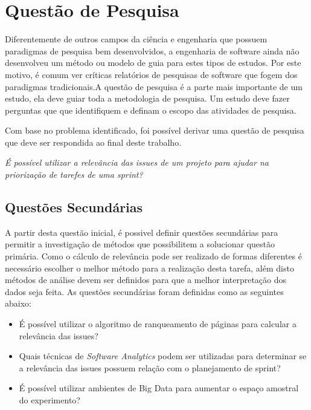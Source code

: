 \section{Questão de Pesquisa}

Diferentemente de outros campos da ciência e engenharia que possuem paradigmas de
pesquisa bem desenvolvidos, a engenharia de software ainda não desenvolveu um
método ou modelo de guia para estes tipos de estudos. Por este motivo, é
comum ver críticas relatórios de pesquisas de software que fogem dos paradigmas
tradicionais\cite{shaw}.A questão de pesquisa é a parte mais importante de um estudo, ela deve guiar toda
a metodologia de pesquisa. Um estudo deve fazer perguntas que que identifiquem e
definam o escopo das atividades de pesquisa\cite{guidelines}.

Com base no problema identificado, foi possível derivar uma questão de pesquisa
que deve ser respondida ao final deste trabalho.

\begin{center}
    \textit{É possível utilizar a relevância das issues de um projeto para ajudar
    na priorização de tarefes de uma sprint?}
\end{center}

\subsection{Questões Secundárias}

A partir desta questão inicial, é possivel definir questões secundárias para
permitir  a investigação de métodos que possibilitem a solucionar questão primária.
Como o cálculo de relevância pode ser realizado
de formas diferentes é necessário escolher o melhor método para a realização
desta tarefa, além disto métodos de análise devem ser definidos para que
a melhor interpretação dos dados seja feita. As questões secundárias
foram definidas como as seguintes abaixo:

\begin{itemize}
    \item É possível utilizar o algoritmo de ranqueamento de páginas para calcular a relevância das issues?
    \item Quais técnicas de \textit{Software Analytics} podem ser utilizadas para
        determinar se a relevância das issues possuem relação com o planejamento
        de sprint?
    \item É possível utilizar ambientes de Big Data para aumentar o espaço amostral
        do experimento?
\end{itemize}


